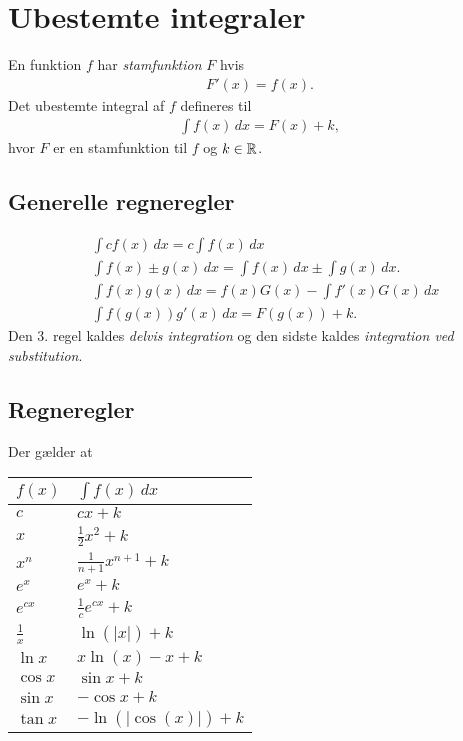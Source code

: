 \section{Ubestemte integraler}
En funktion $f$ har \emph{stamfunktion} $F$ hvis
\begin{align*}
F'(x)=f(x).
\end{align*}
Det ubestemte integral af $f$ defineres til
\begin{align*}
\int f(x)\, dx =F(x)+k,
\end{align*}
hvor $F$ er en stamfunktion til $f$ og $k\in \mathbb{R}$.
\subsection{Generelle regneregler}
\begin{align*}
&\int cf(x) \, d x=c\int f(x)\, dx\\
&\int f(x)\pm g(x) \, d x=\int f(x)\, dx\pm \int g(x) \, dx.\\
&\int f(x)g(x)\, dx=f(x)G(x)-\int f'(x)G(x)\, dx\\
&\int f(g(x))g'(x)\, dx =F(g(x))+k.
\end{align*}
Den 3. regel kaldes \emph{delvis integration} og den sidste kaldes \emph{integration ved substitution}.
\subsection{Regneregler}
Der gælder at
\begin{center}
		\begin{tabular}{@{}l l@{}}
		$f(x)$      & $\int f(x)\, dx$  				\\ \toprule
		$c$			& $cx+k$ 							\\ \midrule
		$x$			& $\frac{1}{2}x^2+k$				\\ \midrule
		$x^n$  		& $\frac{1}{n+1}x^{n+1}+k$			\\ \midrule
		$e^x$  		& $e^x+k$							\\ \midrule
		$e^{cx}$  	& $\frac{1}{c}e^{cx}+k$				\\ \midrule
		$\frac{1}{x}$ & $\ln(\vert x\vert)+k $			\\ \midrule
		$\ln x$ 	& $x\ln(x)-x+k$						\\ \midrule
		$\cos x$  	& $\sin x+k$						\\ \midrule
		$\sin x$  	& $-\cos x+k$						\\ \midrule
		$\tan x$ 	& $-\ln(\vert \cos(x)\vert)+k$		\\ \bottomrule  
	\end{tabular}
\end{center}
